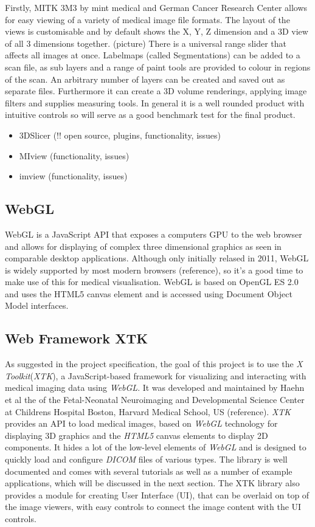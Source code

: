 \documentclass[a4paper,11pt,titlepage]{article}
\begin{document}
     Firstly, MITK 3M3 by mint medical and German Cancer Research Center allows for easy viewing of a variety of medical image file formats. The layout of the views is customisable and by default shows the X, Y, Z dimension and a 3D view of all 3 dimensions together. (picture) There is a universal range slider that affects all images at once. Labelmaps (called Segmentations) can be added to a scan file, as sub layers and a range of paint tools are provided to colour in regions of the scan. An arbitrary number of layers can be created and saved out as separate files. 
     Furthermore it can create a 3D volume renderings, applying image filters and supplies measuring tools. In general it is a well rounded product with intuitive controls so will serve as a good benchmark test for the final product.
\begin{itemize}
\item 3DSlicer (!! open source, plugins, functionality, issues)
\item MIview (functionality, issues)
\item imview (functionality, issues)
\end{itemize}


\subsection{WebGL}

WebGL is a JavaScript API that exposes a computers GPU to the web browser and allows for displaying of complex three dimensional graphics as seen in comparable desktop applications. Although only initially relased in 2011, WebGL is widely supported by most modern browsers (reference), so it's a good time to make use of this for medical visualisation. WebGL is based on OpenGL ES 2.0 and uses the HTML5 canvas element and is accessed using Document Object Model interfaces.

\subsection{Web Framework XTK}

As suggested in the project specification, the goal of this project is to use the \textit{X Toolkit}(\textit{XTK}), a JavaScript-based framework for visualizing and interacting with medical imaging data using \textit{WebGL}. It was developed and maintained by Haehn et al the of the Fetal-Neonatal Neuroimaging and Developmental Science Center at Childrens Hospital Boston, Harvard Medical School, US (reference). \textit{XTK} provides an API to load medical images, based on \textit{WebGL} technology for displaying 3D graphics and the \textit{HTML5} canvas elements to display 2D components. It hides a lot of the low-level elements of \textit{WebGL} and is designed to quickly load and configure \textit{DICOM} files of various types. The library is well documented and comes with several tutorials as well as a number of example applications, which will be discussed in the next section.
The XTK library also provides a module for creating User Interface (UI), that can be overlaid on top of the image viewers, with easy controls to connect the image content with the UI controls.
\end{document}
